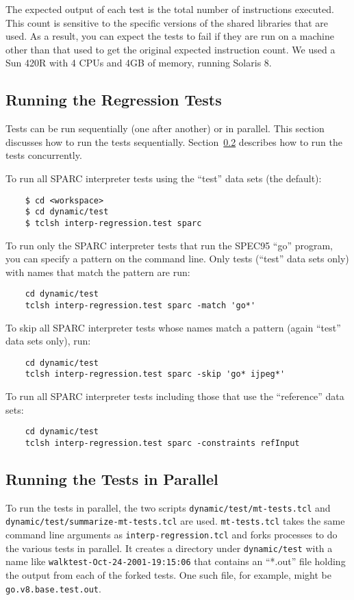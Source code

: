 {The expected output of each test
is the total number of instructions executed.
This count is sensitive to the specific versions of the shared libraries that
are used.
As a result, you can expect the tests to fail if they are run on
a machine other than that used to get the original expected instruction count.
We used a Sun 420R with 4 CPUs and 4GB of memory, running Solaris 8. 


\subsection{Running the Regression Tests} 
Tests can be run sequentially (one after another) or in parallel.
This section discusses how to run the tests sequentially.
Section~\ref{sec-mt-tests} describes how to
run the tests concurrently.

To run all SPARC interpreter tests using the ``test'' data sets (the default):
\begin{verbatim}
    $ cd <workspace>
    $ cd dynamic/test
    $ tclsh interp-regression.test sparc
\end{verbatim}

To run only the SPARC interpreter tests that run the SPEC95 ``go'' program,
you can specify a pattern on the command line.
Only tests (``test'' data sets only)
with names that match the pattern are run:
\begin{verbatim}
    cd dynamic/test
    tclsh interp-regression.test sparc -match 'go*'
\end{verbatim}

To skip all SPARC interpreter tests whose names match a pattern
(again ``test'' data sets only), run:
\begin{verbatim}
    cd dynamic/test
    tclsh interp-regression.test sparc -skip 'go* ijpeg*'
\end{verbatim}

To run all SPARC interpreter tests
including those that use the ``reference'' data sets:
\begin{verbatim}
    cd dynamic/test
    tclsh interp-regression.test sparc -constraints refInput
\end{verbatim}


\subsection{Running the Tests in Parallel} 
\label{sec-mt-tests}

To run the tests in parallel,
the two scripts \texttt{dynamic/test/mt-tests.tcl}
and \texttt{dynamic/test/summarize-mt-tests.tcl}
are used.
\texttt{mt-tests.tcl} takes the same command line arguments
as \texttt{interp-regression.tcl}
and forks processes to do the various tests in parallel.
It creates a directory under
\texttt{dynamic/test} with a name like \texttt{walktest-Oct-24-2001-19:15:06}
that contains an ``*.out'' file holding the output
from each of the forked tests.
One such file, for example, might be \texttt{go.v8.base.test.out}.

}

